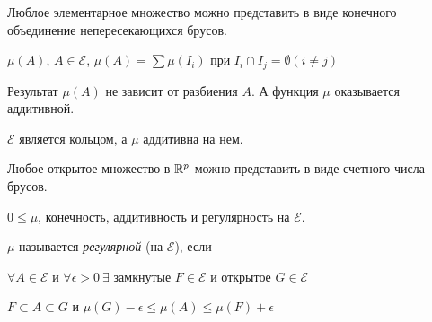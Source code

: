 Люблое элементарное множество можно представить в виде конечного объединение непересекающихся брусов.


$\mu(A)$, $A \in \mathcal{E}$, $\mu(A) = \sum \mu(I_i)$ при $I_i \cap I_j = \emptyset (i \ne j)$

Результат $\mu(A)$ не зависит от разбиения $A$. А функция $\mu$ оказывается аддитивной.

$\mathcal{E}$ является кольцом, а $\mu$ аддитивна на нем.

\begin{problem}
  Любое открытое множество в $\mathbb{R}^p$ можно представить в виде счетного числа брусов.
\end{problem}

$0 \leq \mu$, конечность, аддитивность и регулярность на $\mathcal{E}$.

\begin{definition}
  $\mu$ называется \textit{регулярной} (на $\mathcal{E}$), если 

  $\forall A \in \mathcal{E}$ и $\forall \epsilon>0\ \exists\text{ замкнутые } F \in \mathcal{E} \text{ и открытое } G \in \mathcal{E}$

  $F \subset A \subset G$ и $\mu(G) - \epsilon \leq \mu(A) \leq \mu(F) + \epsilon$
\end{definition}